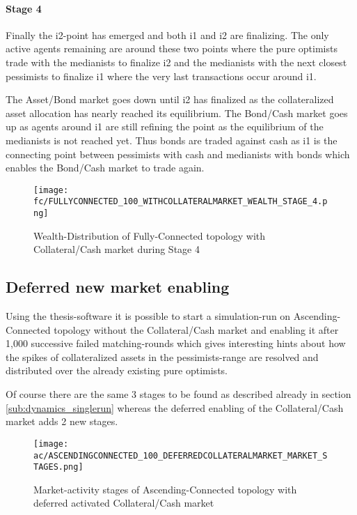 \documentclass[Bachelorarbeit.tex]{subfiles}
\begin{document}
\paragraph{Stage 4}
Finally the i2-point has emerged and both i1 and i2 are finalizing. The only active agents remaining are around these two points where the pure optimists trade with the medianists to finalize i2 and the medianists with the next closest pessimists to finalize i1 where the very last transactions occur around i1.

\medskip

The Asset/Bond market goes down until i2 has finalized as the collateralized asset allocation has nearly reached its equilibrium. The Bond/Cash market goes up as agents around i1 are still refining the point as the equilibrium of the medianists is not reached yet. Thus bonds are traded against cash as i1 is the connecting point between pessimists with cash and medianists with bonds which enables the Bond/Cash market to trade again.

\begin{figure}[H]
	\centering
  \texttt{[image: fc/FULLYCONNECTED\_100\_WITHCOLLATERALMARKET\_WEALTH\_STAGE\_4.png]}
  	\caption{Wealth-Distribution of Fully-Connected topology with Collateral/Cash market during Stage 4}
	\label{fig:markets_FULLYCONNECTED_100_WITHCOLLATERALMARKET_WEALTH_STAGE_4}
\end{figure}

\subsection{Deferred new market enabling}
Using the thesis-software it is possible to start a simulation-run on Ascending-Connected topology without the Collateral/Cash market and enabling it after 1,000 successive failed matching-rounds which gives interesting hints about how the spikes of collateralized assets in the pessimists-range are resolved and distributed over the already existing pure optimists.

\medskip

Of course there are the same 3 stages to be found as described already in section \ref{sub:dynamics_singlerun} whereas the deferred enabling of the Collateral/Cash market adds 2 new stages.

\begin{figure}[H]
	\centering
  \texttt{[image: ac/ASCENDINGCONNECTED\_100\_DEFERREDCOLLATERALMARKET\_MARKET\_STAGES.png]}
  	\caption{Market-activity stages of Ascending-Connected topology with deferred activated Collateral/Cash market}
	\label{fig:markets_ASCENDINGCONNECTED_100_DEFERREDCOLLATERALMARKET_MARKET_STAGES}
\end{figure}
\end{document}
